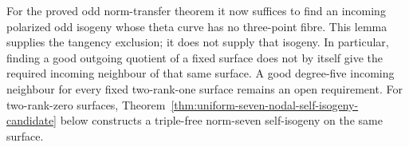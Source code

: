 \begin{remark}
\label{rem:root-nonordinary-odd-theta-nodality-scope}
For the proved odd norm-transfer theorem it now suffices to find
an incoming polarized odd isogeny whose theta curve has no
three-point fibre. This lemma supplies the tangency exclusion;
it does not supply that isogeny. In particular, finding a good
outgoing quotient of a fixed surface does not by itself give
the required incoming neighbour of that same surface.
A good degree-five incoming neighbour for every fixed two-rank-one
surface remains an open requirement. For two-rank-zero surfaces,
Theorem~\ref{thm:uniform-seven-nodal-self-isogeny-candidate} below
constructs a triple-free norm-seven self-isogeny on the same surface.
\end{remark}
